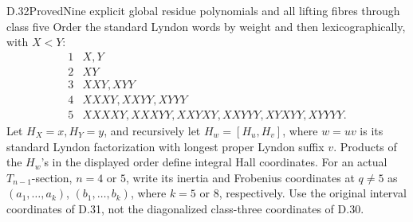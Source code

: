 \begin{statement}{D.32}{Proved}{Nine explicit global residue polynomials and all lifting fibres through class five}
Order the standard Lyndon words by weight and
then lexicographically, with \(X<Y\):
\[
 \begin{array}{c|l}
 1&X,Y\\
 2&XY\\
 3&XXY,XYY\\
 4&XXXY,XXYY,XYYY\\
 5&XXXXY,XXXYY,XXYXY,XXYYY,XYXYY,XYYYY.
 \end{array}                                             \tag{D.32.1}
\]
Let \(H_X=x,H_Y=y\), and recursively let
\(H_w=[H_u,H_v]\), where \(w=uv\) is its
standard Lyndon factorization with longest
proper Lyndon suffix \(v\). Products of the
\(H_w\)'s in the displayed order define
integral Hall coordinates. For an actual
\(T_{n-1}\)-section, \(n=4\) or \(5\), write
its inertia and Frobenius coordinates at \(q\ne5\)
as \((a_1,\ldots,a_k)\),
\((b_1,\ldots,b_k)\), where \(k=5\) or \(8\),
respectively. Use the original interval coordinates
of D.31, not the diagonalized class-three
coordinates of D.30.


\end{statement}
